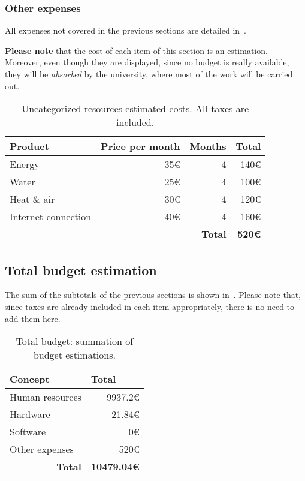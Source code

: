 \subsubsection{Other expenses}

All expenses not covered in the previous sections are detailed in~.

\textbf{Please note} that the cost of each item of this section is an estimation. Moreover, even though they are displayed, since no budget is really available, they will be \textit{absorbed} by the university, where most of the work will be carried out.

\begin{table}[h]
	\centering
	\begin{tabular}{lrrr}
		\hline
		\textbf{Product} & \multicolumn{1}{l}{\textbf{Price per month}} & \multicolumn{1}{l}{\textbf{Months}} & \multicolumn{1}{l}{\textbf{Total}} \\ \hline
		Energy & 35€ & 4 & 140€ \\
		Water & 25€ & 4 & 100€ \\
		Heat \& air & 30€ & 4 & 120€ \\
		Internet connection & 40€ & 4 & 160€ \\ \hline
		& \multicolumn{1}{l}{} & \textbf{Total} & \textbf{520€}
	\end{tabular}
	\caption[Initial estimation: uncategorized resources costs.]{Uncategorized resources estimated costs. All taxes are included.}
	\label{table:other-resources}
\end{table}

\subsection{Total budget estimation}
\label{Management:Budget:Estimation}

The sum of the subtotals of the previous sections is shown in~. Please note that, since taxes are already included in each item appropriately, there is no need to add them here.

\begin{table}[h]
	\centering
	\begin{tabular}{lr}
		\hline
		\textbf{Concept} & \multicolumn{1}{l}{\textbf{Total}} \\ \hline
		Human resources & 9937.2€ \\
		Hardware & 21.84€ \\
		Software & 0€ \\
		Other expenses & 520€ \\ \hline
		\multicolumn{1}{r}{\textbf{Total}} & \multicolumn{1}{l}{\textbf{10479.04€}}
	\end{tabular}
	\caption[Initial estimation: total budget.]{Total budget: summation of budget estimations.}
	\label{table:total-resources}
\end{table}

